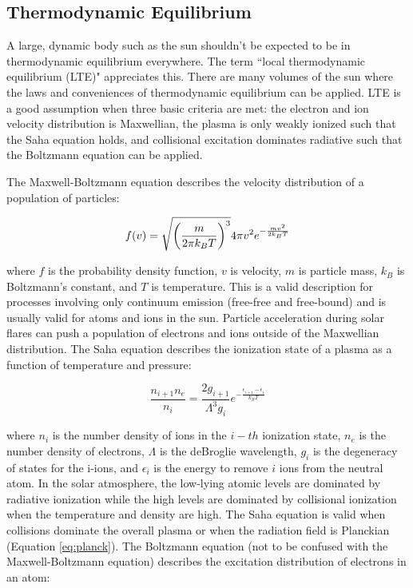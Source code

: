 \subsection{Thermodynamic Equilibrium} 
A large, dynamic body such as the sun shouldn't be expected to be in thermodynamic equilibrium everywhere. The term ``local thermodynamic equilibrium (LTE)" appreciates this. There are many volumes of the sun where the laws and conveniences of thermodynamic equilibrium can be applied. LTE is a good assumption when three basic criteria are met: the electron and ion velocity distribution is Maxwellian, the plasma is only weakly ionized such that the Saha equation holds, and collisional excitation dominates radiative such that the Boltzmann equation can be applied. 

The Maxwell-Boltzmann equation describes the velocity distribution of a population of particles: 

\begin{equation}
    \label{eq:maxwellboltzmann}
    f(v) = \sqrtsign{\left(\frac{m}{2\pi k_BT} \right)^3} 4\pi v^2 e^{-\frac{mv^2}{2k_BT}}
\end{equation}

\noindent where $f$ is the probability density function, $v$ is velocity, $m$ is particle mass, $k_B$ is Boltzmann's constant, and $T$ is temperature. This is a valid description for processes involving only continuum emission (free-free and free-bound) and is usually valid for atoms and ions in the sun. Particle acceleration during solar flares can push a population of electrons and ions outside of the Maxwellian distribution. The Saha equation describes the ionization state of a plasma as a function of temperature and pressure: 

\begin{equation}
    \label{eq:saha}
    \frac{n_{i+1}n_e}{n_i} = \frac{2g_{i+1}}{\Lambda^3 g_i} e^{-\frac{\epsilon_{i+1} - \epsilon_i}{k_BT}}
\end{equation}

\noindent where $n_i$ is the number density of ions in the $i-th$ ionization state, $n_e$ is the number density of electrons, $\Lambda$ is the deBroglie wavelength, $g_i$ is the degeneracy of states for the i-ions, and $\epsilon_i$ is the energy to remove $i$ ions from the neutral atom. In the solar atmosphere, the low-lying atomic levels are dominated by radiative ionization while the high levels are dominated by collisional ionization when the temperature and density are high. The Saha equation is valid when collisions dominate the overall plasma or when the radiation field is Planckian (Equation \ref{eq:planck}). The Boltzmann equation (not to be confused with the Maxwell-Boltzmann equation) describes the excitation distribution of electrons in an atom: 

